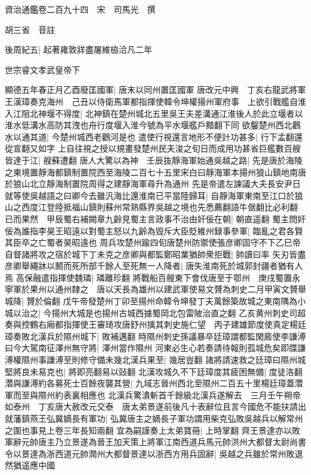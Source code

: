 資治通鑑卷二百九十四　宋　司馬光　撰

胡三省　音註

後周紀五|{
	起著雍敦牂盡屠維栛洽凡二年}


世宗睿文孝武皇帝下

顯德五年春正月乙酉廢匡國軍|{
	唐末以同州置匡國軍}
唐改元中興　丁亥右龍武將軍王漢璋奏克海州　己丑以侍衛馬軍都指揮使韓令坤權揚州軍府事　上欲引戰艦自淮入江阻北神堰不得度|{
	北神鎮在楚州城北五里吳王夫差溝通江淮後人於此立堰者以淮水低溝水高防其洩也舟行度堰入淮今號為平水堰艦戶黯翻下同}
欲鑿楚州西北鸛水以通其道|{
	今楚州城西老鸛河是也}
遣使行視還言地形不便計功甚多|{
	行下孟翻還從宣翻又如字}
上自往視之授以規畫發楚州民夫浚之旬日而成用功甚省巨艦數百艘皆達于江|{
	艘蘇遭翻}
唐人大驚以為神　壬辰抜靜海軍始通吳越之路|{
	先是唐於海陵之東境置靜海都鎮制置院西至海陵二百七十五里宋白曰靜海軍本揚州狼山鎮地南唐於狼山北立靜海制置院周得之建靜海軍尋升為通州}
先是帝遣左諫議大夫長安尹日就等使吳越語之曰卿今去雖汎海比還淮南已平當陸歸耳|{
	自靜海軍東南至江口於狼山之西度江登陸抵福山鎮則蘇州常熟縣界吳越之境也先悉薦翻語牛倨翻比必利翻}
已而果然　甲辰蜀右補闕章九齡見蜀主言政事不治由奸佞在朝|{
	朝直遥翻}
蜀主問奸佞為誰指李昊王昭遠以對蜀主怒以九齡為毁斥大臣貶維州録事參軍|{
	臨亂之君各賢其臣卒之亡蜀者昊昭遠也}
周兵攻楚州踰四旬唐楚州防禦使張彦卿固守不下乙巳帝自督諸將攻之宿於城下丁未克之彦卿與都監鄭昭業猶帥衆拒戰|{
	帥讀曰率}
矢刃皆盡彦卿舉繩牀以鬭而死所部千餘人至死無一人降者|{
	唐失淮南死於城郭封疆者猶有人焉}
高保融遣指揮使魏璘|{
	璘離珍翻}
將戰船百艘東下會伐唐至于鄂州　庚戌蜀置永寧軍於果州以通州隸之　唐以天長為雄州以建武軍使易文贇為刺史二月甲寅文贇舉城降|{
	贇於倫翻}
戊午帝發楚州丁卯至揚州命韓令坤發丁夫萬餘築故城之東南隅為小城以治之|{
	今揚州大城是也揚州古城西據蜀岡北包雷陂治直之翻}
乙亥黄州刺史司超奏與控鶴右廂都指揮使王審琦攻唐舒州擒其刺史施仁望　丙子建雄節度使真定楊廷璋奏敗北漢兵於隰州城下|{
	敗補邁翻}
時隰州刺史孫議暴卒廷璋謂都監閑廄使李謙溥曰今大駕南征澤州無守將|{
	澤州當作隰州}
河東必生心若奏請待報則孤城危矣即牒謙溥權隰州事謙溥至則修守備未幾北漢兵果至|{
	幾居豈翻}
諸將請速救之廷璋曰隰州城堅將良未易克也|{
	將即亮翻易以䜴翻}
北漢攻城久不下廷璋度其疲困無備|{
	度徒洛翻}
濳與謙溥約各募死士百餘夜襲其營|{
	九域志晉州西北至隰州二百五十里楊廷璋蓋濳軍而至與隰州約表裏相應也}
北漢兵驚潰斬首千餘級北漢兵遂解去　三月壬午朔帝如泰州　丁亥唐大赦改元交泰　唐太弟景遂前後凡十表辭位且言今國危不能扶請出就藩鎮燕王弘冀嫡長有軍功|{
	弘冀唐主之嫡長子軍功謂用柴克弘敗吳越兵以解常州之圍也事見上卷三年長知兩翻}
宜為嗣謹奏上太弟寶冊|{
	上時掌翻}
齊王景達亦以敗軍辭元帥唐主乃立景遂為晉王加天策上將軍江南西道兵馬元帥洪州大都督太尉尚書令以景達為浙西道元帥潤州大都督景達以浙西方用兵固辭|{
	吳越之兵雖於常州敗退然猶遥應中國}
